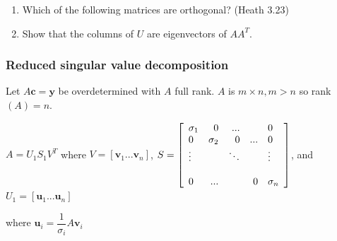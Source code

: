 \documentclass[12pt,letterpaper,noanswers]{exam}
\begin{document}
\begin{enumerate}
\itemsep50pt
\item Which of the following matrices are orthogonal? (Heath 3.23)

\item Show that the columns of $U$ are eigenvectors of $AA^T$.
\end{enumerate}

\vspace{1in}

\subsubsection{Reduced singular value decomposition}

Let $A\mathbf{c} = \mathbf{y}$ be overdetermined with $A$ full rank.  $A$ is $m\times n, m>n$ so rank$(A) = n$.

$A = U_1 S_1 V^T$ where $V = \left[\mathbf{v}_1 ... \mathbf{v}_n\right]$, $S = \left[\begin{array}{l r r r l}\sigma_1 & 0 & ... & & 0\\
0 & \sigma_2 & 0 & ... & 0 \\
\vdots & & \ddots & & \vdots \\
\\
0 & ... & & 0 & \sigma_n\end{array}\right]$, and $U_1 = \left[\mathbf{u}_1 ... \mathbf{u}_n \right]$

where $\mathbf{u}_i = \dfrac{1}{\sigma_i}A\mathbf{v}_i$
\end{document}

